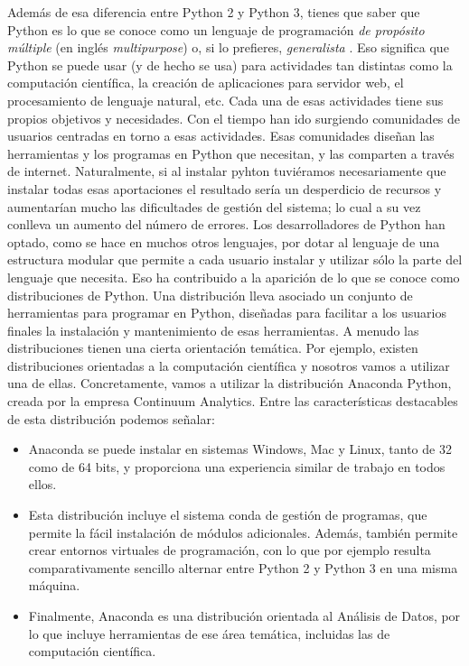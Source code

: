 \documentclass[10pt,a4paper]{article}\usepackage[]{graphicx}\usepackage[]{color}
\newcounter {cont01}
\begin{document}
Además de esa diferencia entre Python 2 y Python 3, tienes que saber que Python es lo que se conoce como un lenguaje de programación {\em de propósito múltiple} (en inglés {\em multipurpose}) o, si lo prefieres, {\em generalista} . Eso significa que Python se puede usar (y de hecho se usa) para actividades tan distintas como la computación científica, la creación de aplicaciones para servidor web, el procesamiento de lenguaje natural, etc. Cada una de esas actividades tiene sus propios objetivos y necesidades. Con el tiempo han ido surgiendo comunidades de usuarios centradas en torno a esas actividades. Esas comunidades diseñan las herramientas y los programas en Python que necesitan, y las comparten a través de internet. Naturalmente, si al instalar pyhton tuviéramos necesariamente que instalar todas esas aportaciones el resultado sería un desperdicio de recursos y aumentarían mucho las dificultades de gestión del sistema; lo cual a su vez conlleva un aumento del número de errores. Los desarrolladores de Python han optado, como se hace en muchos otros lenguajes, por dotar al lenguaje de una estructura modular que permite a cada usuario instalar y utilizar sólo la parte del lenguaje que necesita. Eso ha contribuido a la aparición de lo que se conoce como {\sf distribuciones} de Python. Una distribución lleva asociado un conjunto de herramientas para programar en Python, diseñadas para facilitar a los usuarios finales la instalación y mantenimiento de esas herramientas. A menudo las distribuciones tienen una cierta orientación temática. Por ejemplo, existen distribuciones orientadas a la computación científica y nosotros vamos a utilizar una de ellas. Concretamente, vamos a  utilizar la distribución {\sf Anaconda Python}, creada por la empresa Continuum Analytics. Entre las características destacables de esta distribución podemos señalar:
\begin{itemize}
  \item Anaconda se puede instalar en sistemas Windows, Mac y Linux, tanto de 32 como de 64 bits, y proporciona una experiencia similar de trabajo en todos ellos.
  \item Esta distribución incluye el sistema {\sf conda} de gestión de programas, que permite la fácil instalación de módulos adicionales. Además, también permite crear entornos virtuales de programación, con lo que por ejemplo resulta comparativamente sencillo alternar entre Python 2 y Python 3 en una misma máquina.
  \item Finalmente, Anaconda es una distribución orientada al Análisis de Datos, por lo que incluye herramientas de ese área temática, incluidas las de computación científica.
\end{itemize}
\end{document}
